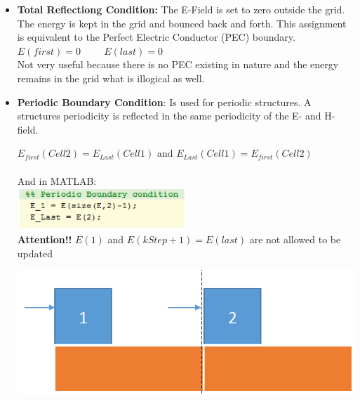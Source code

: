 \begin{itemize}
	\item \textbf{Total Reflectiong Condition:} The E-Field is set to zero outside the grid. The energy is kept in the grid and bounced back and forth. This assignment is equivalent to the Perfect Electric Conductor (PEC) boundary.\\
	$E(first)=0 \hspace{1cm} E(last) = 0$\\
	Not very useful because there is no PEC existing in nature and the energy remains in the grid what is illogical as well.
	\item \textbf{Periodic Boundary Condition}: Is used for periodic structures. A structures periodicity is reflected in the same periodicity of the E- and H-field.\\
	\begin{minipage}{12cm}
		$E_{first}(Cell 2)=E_{Last}(Cell1)$ \hspace{1cm}and\hspace{1cm} $E_{Last}(Cell 1)=E_{first}(Cell2)$ \\ \\
		And in MATLAB:\\
		\includegraphics[width=0.5\textwidth]{./images/periodic_MATLAB.pdf}\\
		\textbf{Attention!!} $E(1)$ and $E(kStep+1)= E(last)$ are not allowed to be updated
	\end{minipage}
	\begin{minipage}{7cm}
		\begin{flushright}
			\includegraphics[width=1\textwidth]{./images/periodic.pdf}\\
		\end{flushright}
	\end{minipage}
	

\end{itemize}
